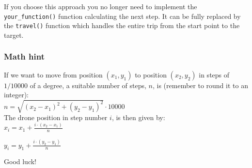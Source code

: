 \documentclass{article}
\begin{document}
If you choose this approach you no longer need to implement the \texttt{your\_function()} function calculating the next step. It can be fully replaced by the \texttt{travel()} function which handles the entire trip from the start point to the target.

\newpage

\subsubsection{Math hint}

If we want to move from position $(x_1,y_1)$ to position $(x_2,y_2)$ in steps of $1/10000$ of a degree, a suitable number of steps, $n$, is (remember to round it to an integer):\\

\begin{math}
n = \sqrt{(x_2-x_1)^2+(y_2-y_1)^2} \cdot 10000
\end{math}
\\

\noindent The drone position in step number $i$, is then given by:\\

\begin{math}
x_i = x_1 + \frac{i \cdot (x_2 - x_1)}{n}
\end{math}

\begin{math}
y_i = y_1 + \frac{i \cdot (y_2 - y_1)}{n}
\end{math}






\vspace{1cm}
\begin{center}
\huge Good luck!
\end{center}

% 
% 




\end{document}
